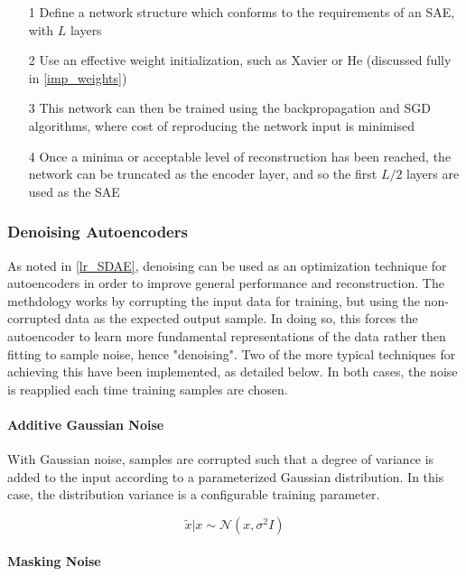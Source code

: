\documentclass[a4paper,latin]{paper}
\begin{document}
\begin{itemize}
	\item [1] Define a network structure which conforms to the requirements of an SAE, with $L$ layers
	\item [2] Use an effective weight initialization, such as Xavier or He (discussed fully in \ref{imp_weights})
	\item [3] This network can then be trained using the backpropagation and SGD algorithms, where cost of reproducing the network input is minimised
	\item [4] Once a minima or acceptable level of reconstruction has been reached, the network can be truncated as the encoder layer, and so the first $L/2$ layers are used as the SAE
\end{itemize}

\subsubsection{Denoising Autoencoders}

As noted in \ref{lr_SDAE}, denoising can be used as an optimization technique for autoencoders in order to improve general performance and reconstruction. The methdology works by corrupting the input data for training, but using the non-corrupted data as the expected output sample. In doing so, this forces the autoencoder to learn more fundamental representations of the data rather then fitting to sample noise, hence "denoising". Two of the more typical techniques for achieving this have been implemented, as detailed below. In both cases, the noise is reapplied each time training samples are chosen.

\paragraph{Additive Gaussian Noise}

With Gaussian noise, samples are corrupted such that a degree of variance is added to the input according to a parameterized Gaussian distribution. In this case, the distribution variance is a configurable training parameter.

\begin{equation}
\tilde{{x}} | {x} \sim \mathcal{N}\left({x}, \sigma^{2} I\right)
\end{equation}

\paragraph{Masking Noise}
\end{document}
